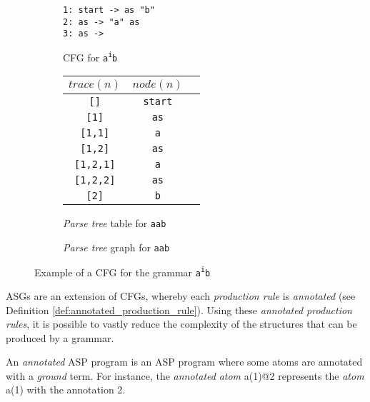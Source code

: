 \begin{figure}[H]
\begin{subfigure}{0.3\textwidth}
\texttt{1: start -> as "b" \\ 2: as -> "a" as \\ 3: as ->\\}
\caption{CFG for \texttt{a\textsuperscript{i}b}}
\end{subfigure}
\begin{subfigure}{0.34\textwidth}
\begin{table}[H]
\centering
\begin{tabular}{@{}ccc@{}}
\toprule
\textbf{$trace(n)$} & \textbf{$node(n)$} \\ \midrule
\texttt{[]} & \texttt{start} \\
\texttt{[1]} & \texttt{as} \\
\texttt{[1,1]} & \texttt{a} \\
\texttt{[1,2]} & \texttt{as} \\
\texttt{[1,2,1]} & \texttt{a} \\
\texttt{[1,2,2]} & \texttt{as} \\
\texttt{[2]} & \texttt{b} \\ \bottomrule
\end{tabular}
\end{table}
\caption{\textit{Parse tree} table for \texttt{aab}}
\end{subfigure}
\begin{subfigure}{0.34\textwidth}
\centering
{}
\caption{\textit{Parse tree} graph for \texttt{aab}}
\end{subfigure}
\caption{Example of a CFG for the grammar \texttt{a\textsuperscript{i}b}}
\label{fig:cfg_parse_tree_example}
\end{figure}

\noindent
ASGs are an extension of CFGs, whereby each \textit{production rule} is \textit{annotated} (see Definition \ref{def:annotated_production_rule}). Using these \textit{annotated production rules}, it is possible to vastly reduce the complexity of the structures that can be produced by a grammar.

\begin{definition}
An \textit{annotated} ASP program is an ASP program where some atoms are annotated with a \textit{ground} term. For instance, the \textit{annotated} \textit{atom} a(1)@2 represents the \textit{atom} a(1) with the annotation 2.
\end{definition}

